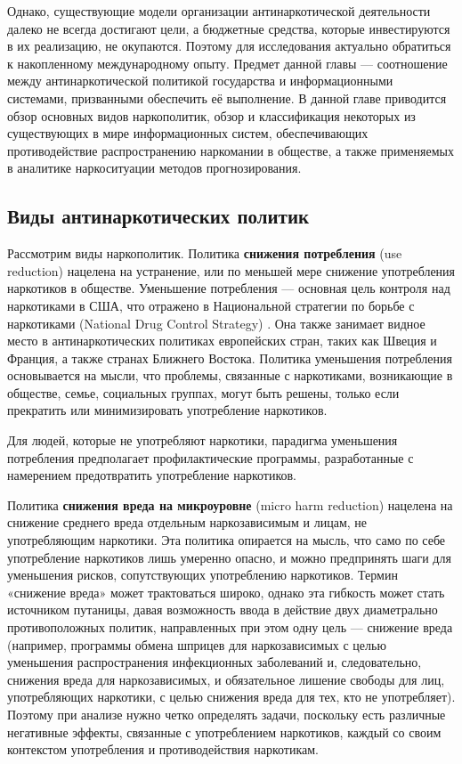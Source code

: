 Однако, существующие модели организации антинаркотической деятельности далеко не 
всегда достигают цели, а бюджетные средства, которые инвестируются в их 
реализацию, не окупаются. Поэтому для исследования актуально обратиться к 
накопленному международному опыту. Предмет данной главы — соотношение между 
антинаркотической политикой государства и информационными системами, призванными 
обеспечить её выполнение. В данной главе приводится обзор основных видов 
наркополитик, обзор и классификация некоторых из существующих в мире 
информационных систем, обеспечивающих противодействие распространению наркомании 
в обществе, а также применяемых в аналитике наркоситуации методов
прогнозирования.

\subsection{Виды антинаркотических политик}

Рассмотрим виды наркополитик. Политика \textbf{снижения потребления} (use 
reduction) нацелена на устранение, или по меньшей мере снижение употребления 
наркотиков в обществе. Уменьшение потребления —  основная цель контроля над 
наркотиками в США, что отражено в Национальной стратегии по борьбе с наркотиками 
(National Drug Control Strategy) \cite{us_nat_drug_strat}. Она также занимает 
видное место в антинаркотических политиках европейских стран, таких как Швеция и 
Франция, а также странах Ближнего Востока. Политика уменьшения потребления 
основывается на мысли, что проблемы, связанные с наркотиками,  возникающие в 
обществе, семье, социальных группах, могут быть решены, только если прекратить 
или минимизировать употребление наркотиков. 

Для людей, которые не употребляют наркотики, парадигма уменьшения потребления 
предполагает профилактические программы, разработанные с намерением 
предотвратить употребление наркотиков.

Политика \textbf{снижения вреда на микроуровне} (micro harm reduction) нацелена 
на снижение среднего вреда отдельным наркозависимым и лицам, не употребляющим 
наркотики. Эта политика опирается на мысль, что само по себе употребление 
наркотиков лишь умеренно опасно, и можно предпринять шаги для уменьшения рисков, 
сопутствующих употреблению наркотиков. Термин «снижение вреда» может 
трактоваться широко, однако эта гибкость может стать источником путаницы, давая 
возможность ввода в действие двух диаметрально противоположных политик, 
направленных при этом одну цель — снижение вреда (например, программы обмена 
шприцев для наркозависимых с целью уменьшения распространения инфекционных 
заболеваний и, следовательно, снижения вреда для наркозависимых, и обязательное 
лишение свободы для лиц, употребляющих наркотики, с целью снижения вреда для 
тех, кто не употребляет). Поэтому при анализе нужно четко определять задачи, 
поскольку есть различные негативные эффекты, связанные с употреблением 
наркотиков, каждый со своим контекстом употребления и противодействия 
наркотикам.

